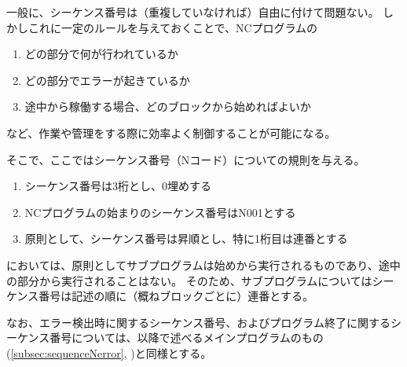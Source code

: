 

一般に、シーケンス番号は（重複していなければ）自由に付けて問題ない。
しかしこれに一定のルールを与えておくことで、NCプログラムの
\begin{enumerate}[label=\sarrow]
\item どの部分で何が行われているか
\item どの部分でエラーが起きているか
\item 途中から稼働する場合、どのブロックから始めればよいか
\end{enumerate}
など、作業や管理をする際に効率よく制御することが可能になる。

そこで、ここではシーケンス番号（Nコード）についての規則を与える。



\begin{enumerate}[label=\Roman*), ref=\Roman*)]
\item シーケンス番号は3桁とし、0埋めする
\item NCプログラムの始まりのシーケンス番号は{\ttfamily N001}とする
\item 原則として、シーケンス番号は昇順とし、特に1桁目は連番とする
\end{enumerate}


\DMC においては、原則としてサブプログラムは始めから実行されるものであり、途中の部分から実行されることはない。
そのため、サブプログラムについてはシーケンス番号は記述の順に（概ねブロックごとに）連番とする。

なお、エラー検出時に関するシーケンス番号、およびプログラム終了に関するシーケンス番号については、以降で述べるメインプログラムのもの(\autoref{subsec:sequenceNerror}, )と同様とする。



